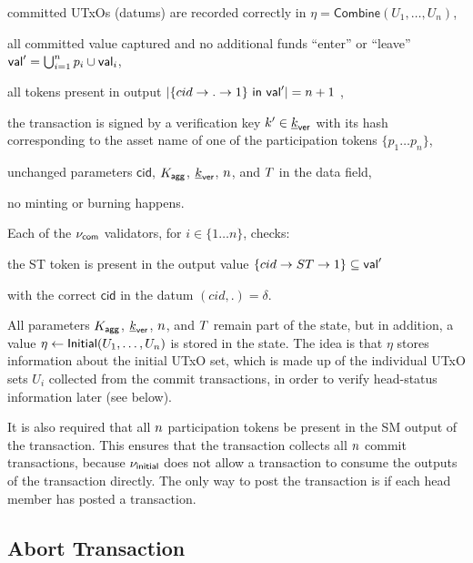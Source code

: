 \begin{menumerate}
  \item committed UTxOs (datums) are recorded correctly in
  $\eta = \mathsf{Combine}(U_{1}, \ldots, U_{n})$,
  \item all committed value captured and no additional funds ``enter'' or ``leave''
  $\mathsf{val}' = \bigcup_{i=1}^{n} p_{i} \cup \mathsf{val}_{i}$,
  \item all tokens present in output
  $|\{cid \rightarrow . \rightarrow 1\} ~ \mathsf{in} ~ \mathsf{val}'| = n + 1$
  ,
  \item the transaction is signed by a verification key $k' \in \underline{k}_{\mathsf{ver}}$ with its
  hash corresponding to the asset name of one of the participation tokens
  $\{p_1 \dots p_n\}$,
  \item unchanged parameters $\mathsf{cid}$, $K_{\mathsf{agg}}$, $\underline{k}_{\mathsf{ver}}$, $n$, and
  $T$ in the data field,
  \item no minting or burning happens.
\end{menumerate}

Each of the $\nu_\mathsf{com}$ validators, for $i \in \{ 1\dots n\}$, checks:
    \begin{menumerate}
      \item the ST token is present in the output value $\{cid \rightarrow ST \rightarrow 1\} \subseteq \mathsf{val}'$
      \item with the correct $\mathsf{cid}$ in the datum $(cid,.) = \delta$.
    \end{menumerate}


All parameters $K_{\mathsf{agg}}$, $\underline{k}_{\mathsf{ver}}$, $n$, and $T$ remain part of the state,
but in addition, a value $\eta \gets \mathsf{Initial}(U_1,\ldots,U_n)$ is stored in
the state. The idea is that $\eta$ stores information about the initial UTxO
set, which is made up of the individual UTxO sets $U_i$ collected from the
commit transactions, in order to verify head-status information later (see
below).

It is also required that all $n$ participation tokens be present in the SM
output of the \mtxCollect{} transaction. This ensures that the \mtxCollect{}
transaction collects all $n$ commit transactions, because $\nu_\mathsf{initial}$ does
not allow a \mtxCollect{} transaction to consume the outputs of the \mtxInit{}
transaction directly. The only way to post the \mtxCollect{} transaction is if
each head member has posted a \mtxCommit{} transaction.



\subsection{Abort Transaction}\label{sec:abort-tx} 

